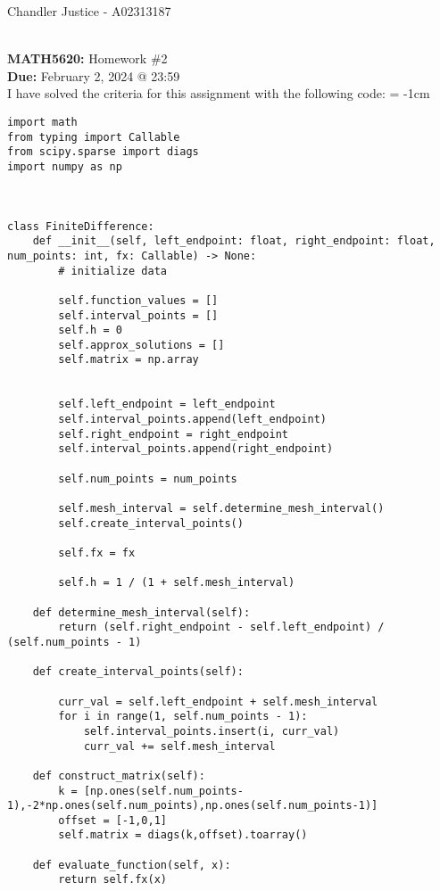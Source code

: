 \documentclass[10pt]{article}
\begin{document}
\begin{flushright}
Chandler Justice - A02313187
\end{flushright}
\noindent \underline{\hspace{3in}}\\
\textbf{MATH5620:} Homework \#2\\
\textbf{Due:} February 2, 2024 @ 23:59\\

I have solved the criteria for this assignment with the following code:
\begingroup
\makeatletter
\@totalleftmargin = -1cm
\begin{verbatim}
import math
from typing import Callable
from scipy.sparse import diags
import numpy as np



class FiniteDifference:
    def __init__(self, left_endpoint: float, right_endpoint: float, num_points: int, fx: Callable) -> None:
        # initialize data

        self.function_values = []
        self.interval_points = []
        self.h = 0
        self.approx_solutions = []
        self.matrix = np.array 


        self.left_endpoint = left_endpoint
        self.interval_points.append(left_endpoint)
        self.right_endpoint = right_endpoint
        self.interval_points.append(right_endpoint)

        self.num_points = num_points 

        self.mesh_interval = self.determine_mesh_interval()
        self.create_interval_points()
        
        self.fx = fx 

        self.h = 1 / (1 + self.mesh_interval)

    def determine_mesh_interval(self):
        return (self.right_endpoint - self.left_endpoint) / (self.num_points - 1)

    def create_interval_points(self):
        
        curr_val = self.left_endpoint + self.mesh_interval
        for i in range(1, self.num_points - 1):
            self.interval_points.insert(i, curr_val)
            curr_val += self.mesh_interval
        
    def construct_matrix(self):
        k = [np.ones(self.num_points-1),-2*np.ones(self.num_points),np.ones(self.num_points-1)]
        offset = [-1,0,1]
        self.matrix = diags(k,offset).toarray()

    def evaluate_function(self, x):
        return self.fx(x)


\end{verbatim}
\end{document}
